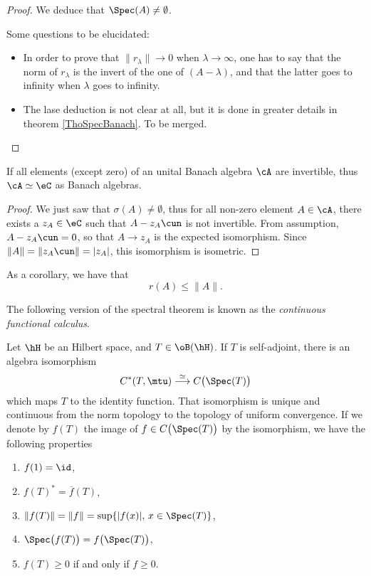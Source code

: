\begin{proof}
	We deduce that $\Spec(A)\neq\emptyset$.

	\begin{probleme}
		Some questions to be elucidated:
	\begin{itemize}
	\item In order to prove that $\| r_{\lambda} \|\to 0$ when $\lambda\to\infty$, one has to say that the norm of $r_{\lambda}$ is the invert of the one of $(A-\lambda)$,  and that the latter goes to infinity when $\lambda$ goes to infinity.
	\item The lase deduction is not clear at all, but it is done in greater details in theorem \ref{ThoSpecBanach}. To be merged.
	\end{itemize}

	\end{probleme}
\end{proof}



\begin{corollary} 
If all elements (except zero) of an unital Banach algebra $\cA$ are invertible, thus $\cA\simeq\eC$ as Banach algebras.
\label{cor:GelfandMazur}
\end{corollary}

\begin{proof}
	We just saw that $\sigma(A)\neq\emptyset$, thus for all non-zero element $A\in\cA$, there exists a $z_A\in\eC$ such that $A-z_A\cun$ is not invertible. From assumption, $A-z_A\cun=0$, so that $A\to z_A$ is the expected isomorphism. Since $\|A\|=\|z_A\cun\|=|z_A|$, this isomorphism is isometric.
\end{proof}

As a corollary, we have that 
\begin{equation}
r(A)\leq\|A\|.
\end{equation}

The following version of the spectral theorem is known as the \emph{continuous functional calculus}.
\begin{theorem}			\label{ThoSpectralTho}
Let $\hH$ be an Hilbert space, and $T\in\oB(\hH)$. If $T$ is self-adjoint, there is an algebra isomorphism
\[ 
  C^*(T,\mtu)\stackrel{\simeq}{\longrightarrow}C\big( \Spec(T) \big)
\]
which maps $T$ to the identity function. That isomorphism is unique and continuous from the norm topology to the topology of uniform convergence. If we denote by $f(T)$ the image of $f\in C\big( \Spec(T) \big)$ by the isomorphism, we have the following properties
\begin{enumerate}
\item $f(1)=\id$,
\item $f(T)^*=\overline{ f }(T)$,
\item $\| f(T) \|=\| f \|=\sup\{ | f(x) |,\,x\in\Spec(T) \}$,
\item\label{ItemSpecffSpecThoSpectral} $\Spec\big( f(T) \big)=f\big( \Spec(T) \big)$,
\item $f(T)\geq 0$ if and only if $f\geq 0$.
\end{enumerate}
\end{theorem}

